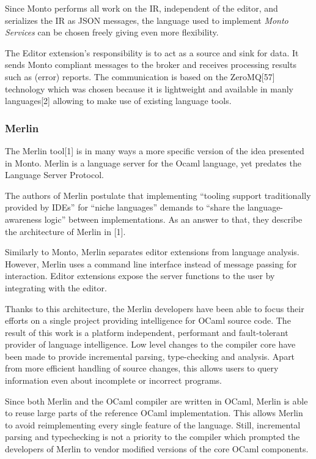 \documentclass[
  a4paper,
  bibtex,
  english,
  nomenclature]{kthlatex/kththesis/kththesis}
\begin{document}
Since Monto performs all work on the IR, independent of the editor, and
serializes the IR as JSON messages, the language used to implement
\emph{Monto Services} can be chosen freely giving even more flexibility.

The Editor extension's responsibility is to act as a source and sink for
data. It sends Monto compliant messages to the broker and receives
processing results such as (error) reports. The communication is based
on the ZeroMQ{[}57{]} technology which was chosen because it is
lightweight and available in manly languages{[}2{]} allowing to make use
of existing language tools.

\hypertarget{sec:merlin}{%
\subsubsection{Merlin}\label{sec:merlin}}

The Merlin tool{[}1{]} is in many ways a more specific version of the
idea presented in Monto. Merlin is a language server for the Ocaml
language, yet predates the Language Server Protocol.

The authors of Merlin postulate that implementing ``tooling support
traditionally provided by IDEs'' for ``niche languages'' demands to
``share the language-awareness logic'' between implementations. As an
answer to that, they describe the architecture of Merlin in {[}1{]}.

Similarly to Monto, Merlin separates editor extensions from language
analysis. However, Merlin uses a command line interface instead of
message passing for interaction. Editor extensions expose the server
functions to the user by integrating with the editor.

Thanks to this architecture, the Merlin developers have been able to
focus their efforts on a single project providing intelligence for OCaml
source code. The result of this work is a platform independent,
performant and fault-tolerant provider of language intelligence. Low
level changes to the compiler core have been made to provide incremental
parsing, type-checking and analysis. Apart from more efficient handling
of source changes, this allows users to query information even about
incomplete or incorrect programs.

Since both Merlin and the OCaml compiler are written in OCaml, Merlin is
able to reuse large parts of the reference OCaml implementation. This
allows Merlin to avoid reimplementing every single feature of the
language. Still, incremental parsing and typechecking is not a priority
to the compiler which prompted the developers of Merlin to vendor
modified versions of the core OCaml components.
\end{document}

